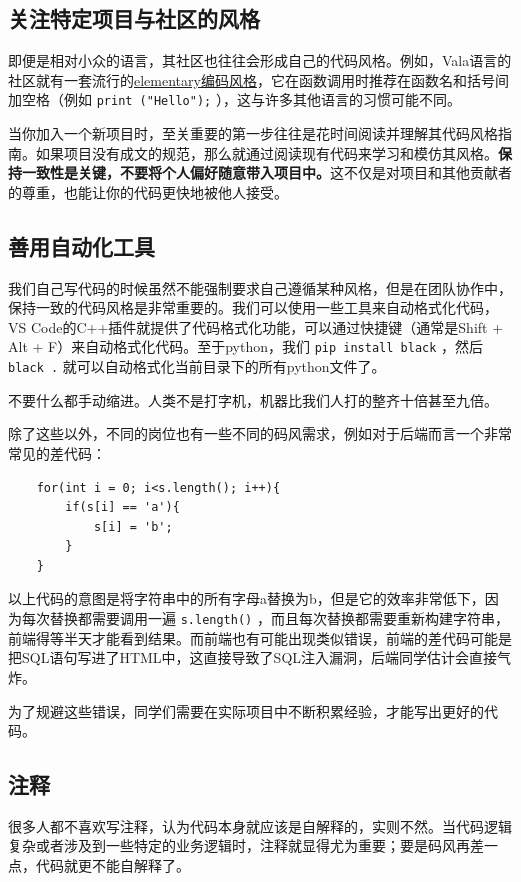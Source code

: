 \subsection{关注特定项目与社区的风格}
即便是相对小众的语言，其社区也往往会形成自己的代码风格。例如，Vala语言的社区就有一套流行的\href{https://docs.elementary.io/develop/writing-apps/code-style}{elementary编码风格}，它在函数调用时推荐在函数名和括号间加空格（例如 \texttt{print ("Hello");} ），这与许多其他语言的习惯可能不同。

当你加入一个新项目时，至关重要的第一步往往是花时间阅读并理解其代码风格指南。如果项目没有成文的规范，那么就通过阅读现有代码来学习和模仿其风格。\textbf{保持一致性是关键，不要将个人偏好随意带入项目中。}这不仅是对项目和其他贡献者的尊重，也能让你的代码更快地被他人接受。

\subsection{善用自动化工具}
我们自己写代码的时候虽然不能强制要求自己遵循某种风格，但是在团队协作中，保持一致的代码风格是非常重要的。我们可以使用一些工具来自动格式化代码，VS Code的C++插件就提供了代码格式化功能，可以通过快捷键（通常是Shift + Alt + F）来自动格式化代码。至于python，我们 \texttt{pip install black} ，然后 \texttt{black .} 就可以自动格式化当前目录下的所有python文件了。

不要什么都手动缩进。人类不是打字机，机器比我们人打的整齐十倍甚至九倍。

除了这些以外，不同的岗位也有一些不同的码风需求，例如对于后端而言一个非常常见的差代码：
\begin{verbatim}
    for(int i = 0; i<s.length(); i++){
        if(s[i] == 'a'){
            s[i] = 'b';
        }
    }
\end{verbatim}
以上代码的意图是将字符串中的所有字母a替换为b，但是它的效率非常低下，因为每次替换都需要调用一遍 \texttt{s.length()} ，而且每次替换都需要重新构建字符串，前端得等半天才能看到结果。而前端也有可能出现类似错误，前端的差代码可能是把SQL语句写进了HTML中，这直接导致了SQL注入漏洞，后端同学估计会直接气炸。

为了规避这些错误，同学们需要在实际项目中不断积累经验，才能写出更好的代码。

\subsection{注释}

很多人都不喜欢写注释，认为代码本身就应该是自解释的，实则不然。当代码逻辑复杂或者涉及到一些特定的业务逻辑时，注释就显得尤为重要；要是码风再差一点，代码就更不能自解释了。

